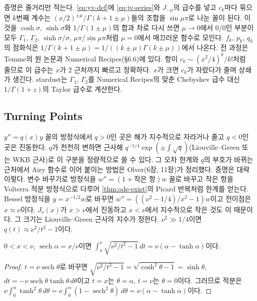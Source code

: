 증명은 줄거리만 적는다. \cref{eq:yv-def}에 \cref{eq:jv-series}와 $J_{-\mu}$의 급수를 넣고 $c_k$마다 묶으면 $k$번째 계수는 $(x/2)^{\pm\mu}/\Gamma(k+1\pm\mu)$들의 조합을 $\sin\mu\pi$로 나눈 꼴이 된다. 이것을 $\cosh\sigma$, $\sinh\sigma$와 $1/\Gamma(1\pm\mu)$의 합과 차로 다시 쓰면 $\mu\to0$에서 $0/0$인 부분이 모두 $\Gamma_1$, $\Gamma_2$, $\sinh\sigma/\sigma$, $\mu\pi/\sin\mu\pi$처럼 $\mu=0$에서 매끄러운 함수로 모인다. $f_k$, $p_k$, $q_k$의 점화식은 $1/\Gamma(k+1\pm\mu)=1/((k\pm\mu)\Gamma(k\pm\mu))$에서 나온다. 전 과정은 Temme의 원 논문과 Numerical Recipes\cite{press2007nr}(§6.6)에 있다. 항이 $c_k\sim(x^2/4)^k/k!$처럼 줄므로 이 급수는 $x$가 $2$ 근처까지 빠르고 정확하다. $x$가 크면 $c_k$가 자랐다가 줄며 상쇄가 생긴다. stardust는 $\Gamma_1$, $\Gamma_2$를 Numerical Recipes의 맞춘 Chebyshev 급수 대신 $1/\Gamma(1+z)$의 Taylor 급수로 계산한다.

\subsection{Turning Points}

$y''=q(x)y$ 꼴의 방정식에서 $q>0$인 곳은 해가 지수적으로 자라거나 줄고 $q<0$인 곳은 진동한다. $q$가 천천히 변하면 근사해 $q^{-1/4}\exp(\pm\int\sqrt q)$(Liouville--Green 또는 WKB 근사)로 이 구분을 정량적으로 쓸 수 있다. 그 오차 한계와 $q$의 부호가 바뀌는  근처에서 Airy 함수로 이어 붙이는 방법은 Olver\cite{olver1974asymptotics}(6장, 11장)가 정리했다. 증명은 대략 이렇다. 변수 바꾸기로 방정식을 $w''=(1+\text{작은 항})w$ 꼴로 바꾸고 작은 항을 Volterra 적분 방정식으로 다루어 \cref{thm:ode-exist}의 Picard 반복처럼 한계를 얻는다. Bessel 방정식을 $y=x^{-1/2}w$로 바꾸면 $w''=((\nu^2-1/4)/x^2-1)w$이고 전이점은 $x\approx\nu$이다. $J_\nu(x)$가 $x>\nu$에서 진동하고 $x<\nu$에서 지수적으로 작은 것도 이 때문이다. 그 크기는 Liouville--Green 근사의 지수가 정한다. $\nu^2\gg1/4$이면 $q(t)\approx\nu^2/t^2-1$이다.

\begin{proposition}
\label{prop:debye-exponent}
$0<x<\nu$, $\operatorname{sech}\alpha=x/\nu$이면 $\int_x^\nu\sqrt{\nu^2/t^2-1}\,dt=\nu(\alpha-\tanh\alpha)$이다.
\end{proposition}

\begin{proof}
$t=\nu\operatorname{sech}\theta$로 바꾸면 $\sqrt{\nu^2/t^2-1}=\sqrt{\cosh^2\theta-1}=\sinh\theta$, $dt=-\nu\operatorname{sech}\theta\tanh\theta\,d\theta$이고 $t=x$는 $\theta=\alpha$, $t=\nu$는 $\theta=0$이다. 그러므로 적분은 $\nu\int_0^\alpha\tanh^2\theta\,d\theta=\nu\int_0^\alpha(1-\operatorname{sech}^2\theta)\,d\theta=\nu(\alpha-\tanh\alpha)$이다.
\end{proof}

